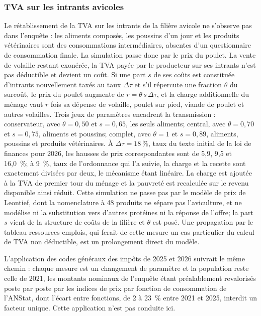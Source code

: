 \documentclass[11pt,a4paper]{article}
\begin{document}
\subsubsection{TVA sur les intrants avicoles}
\label{sec:choc-avicole}

Le rétablissement de la TVA sur les intrants de la filière avicole ne s'observe
pas dans l'enquête : les aliments composés, les poussins d'un jour et les
produits vétérinaires sont des consommations intermédiaires, absentes d'un
questionnaire de consommation finale. La simulation passe donc par le prix du
poulet. La vente de volaille restant exonérée, la TVA payée par le producteur
sur ses intrants n'est pas déductible et devient un coût. Si une part $s$ de
ses coûts est constituée d'intrants nouvellement taxés au taux $\Delta\tau$ et
s'il répercute une fraction $\theta$ du surcoût, le prix du poulet augmente de
$r=\theta\,s\,\Delta\tau$, et la charge additionnelle du ménage vaut $r$ fois
sa dépense de volaille, poulet sur pied, viande de poulet et autres volailles.
Trois jeux de paramètres encadrent la transmission : conservateur, avec
$\theta=0{,}50$ et $s=0{,}65$, les seuls aliments; central, avec $\theta=0{,}70$
et $s=0{,}75$, aliments et poussins; complet, avec $\theta=1$ et $s=0{,}89$,
aliments, poussins et produits vétérinaires. À $\Delta\tau=18~\%$, taux du texte
initial de la loi de finances pour 2026, les hausses de prix correspondantes
sont de 5,9, 9,5 et 16,0~\%; à 9~\%, taux de l'ordonnance qui l'a suivie, la
charge et la recette sont exactement divisées par deux, le mécanisme étant
linéaire. La charge est ajoutée à la TVA de premier tour du ménage et la
pauvreté est recalculée sur le revenu disponible ainsi réduit. Cette simulation
ne passe pas par le modèle de prix de Leontief, dont la nomenclature à 48
produits ne sépare pas l'aviculture, et ne modélise ni la substitution vers
d'autres protéines ni la réponse de l'offre; la part $s$ vient de la structure
de coûts de la filière et $\theta$ est posé. Une propagation par le tableau
ressources-emplois, qui ferait de cette mesure un cas particulier du calcul de
TVA non déductible, est un prolongement direct du modèle.

L'application des codes généraux des impôts de 2025 et 2026 suivrait le même
chemin : chaque mesure est un changement de paramètre et la population reste
celle de 2021, les montants nominaux de l'enquête étant préalablement
revalorisés poste par poste par les indices de prix par fonction de
consommation de l'ANStat, dont l'écart entre fonctions, de 2 à 23~\% entre 2021
et 2025, interdit un facteur unique. Cette application n'est pas conduite ici.
\end{document}
